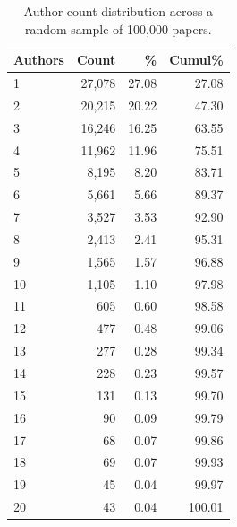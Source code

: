 \documentclass[11pt]{article}
\begin{document}
\begin{table}[htbp]
\centering

\begin{tabular}{lrrr}
\toprule
\textbf{Authors} & \textbf{Count} & \% & \textbf{Cumul}\% \\
\midrule
1 & 27,078 & 27.08 & 27.08 \\
2 & 20,215 & 20.22 & 47.30 \\
3 & 16,246 & 16.25 & 63.55 \\
4 & 11,962 & 11.96 & 75.51 \\
5 & 8,195 & 8.20 & 83.71 \\
6 & 5,661 & 5.66 & 89.37 \\
7 & 3,527 & 3.53 & 92.90 \\
8 & 2,413 & 2.41 & 95.31 \\
9 & 1,565 & 1.57 & 96.88 \\
10 & 1,105 & 1.10 & 97.98 \\
11 & 605 & 0.60 & 98.58 \\
12 & 477 & 0.48 & 99.06 \\
13 & 277 & 0.28 & 99.34 \\
14 & 228 & 0.23 & 99.57 \\
15 & 131 & 0.13 & 99.70 \\
16 & 90 & 0.09 & 99.79 \\
17 & 68 & 0.07 & 99.86 \\
18 & 69 & 0.07 & 99.93 \\
19 & 45 & 0.04 & 99.97 \\
20 & 43 & 0.04 & 100.01 \\
\bottomrule
\end{tabular}
\caption{Author count distribution across a random sample of 100,000 papers.}
\label{tab:authors-dist-sampled}
\end{table}
\end{document}
